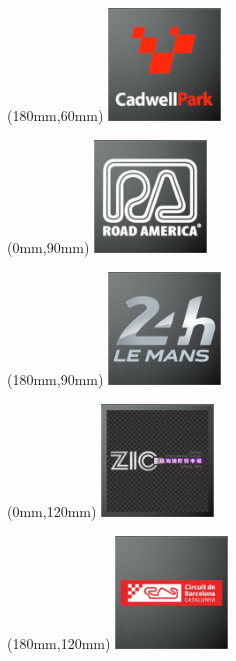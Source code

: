 \begin{textblock*}{30mm}(180mm,60mm)%
\includegraphics[width=30mm]{LG/2015-05-20_00076.png}
\end{textblock*}
\begin{textblock*}{30mm}(0mm,90mm)%
\includegraphics[width=30mm]{LG/2015-05-20_00092.png}
\end{textblock*}
\begin{textblock*}{30mm}(180mm,90mm)%
\includegraphics[width=30mm]{LG/2015-05-20_00084.png}
\end{textblock*}
\begin{textblock*}{30mm}(0mm,120mm)%
\includegraphics[width=30mm]{LG/2015-05-20_00099.png}
\end{textblock*}
\begin{textblock*}{30mm}(180mm,120mm)%
\includegraphics[width=30mm]{LG/2015-05-20_00078.png}
\end{textblock*}
